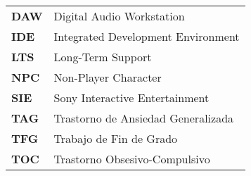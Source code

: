 
\renewcommand{\arraystretch}{1.5}



\begin{longtable}{l p{13.7cm}}
	
\textbf{DAW} & Digital Audio Workstation \\
\textbf{IDE} & Integrated Development Environment \\
\textbf{LTS} & Long-Term Support \\
\textbf{NPC} & Non-Player Character \\
\textbf{SIE} & Sony Interactive Entertainment \\
\textbf{TAG} & Trastorno de Ansiedad Generalizada \\
\textbf{TFG} & Trabajo de Fin de Grado \\
\textbf{TOC} & Trastorno Obsesivo-Compulsivo \\

\end{longtable}
